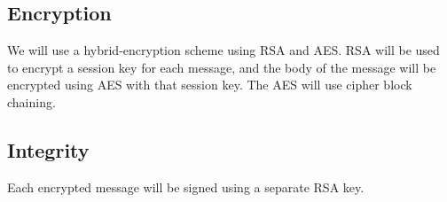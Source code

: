 \documentclass{scrartcl}
\begin{document}
\subsection{Encryption} 
We will use a hybrid-encryption scheme using RSA and AES. RSA will be used to encrypt a session key for each message, and the body of the message will be encrypted using AES with that session key. The AES will use cipher block chaining.

\subsection{Integrity}
Each encrypted message will be signed using a separate RSA key.
\end{document}
